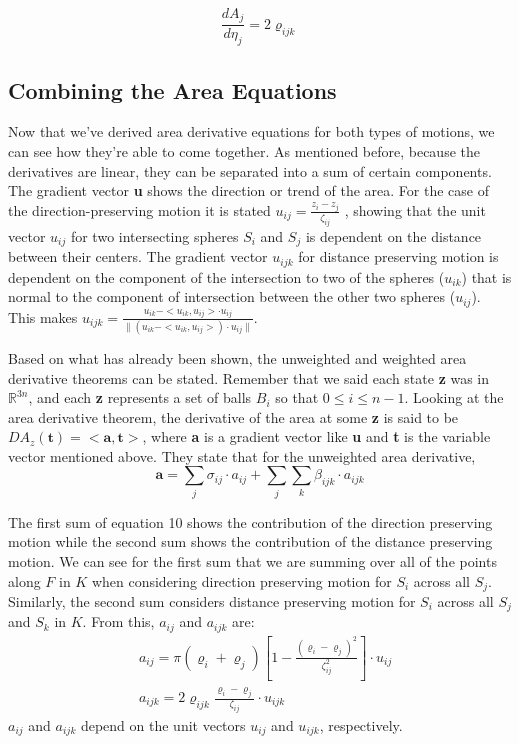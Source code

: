\documentclass{article}
\newcommand{\R}{\mathbb{R}}
\begin{document}
\begin{equation*}
\frac{dA_j}{d\eta_j }= 2\varrho_{ijk}
\end{equation*}

\subsection{Combining the Area Equations}
Now that we've derived area derivative equations for both types of motions, we can see how they’re able to come together. As mentioned before, because the derivatives are linear, they can be separated into a sum of certain components. The gradient vector \textbf{u} shows the direction or trend of the area. For the case of the direction-preserving motion it is stated $u_{ij} = \frac{z_i - z_j}{\zeta_{ij}}$ , showing that the unit vector $u_{ij}$ for two intersecting spheres $S_i$ and $S_j$ is dependent on the distance between their centers. The gradient vector $u_{ijk}$ for distance preserving motion is dependent on the component of the intersection to two of the spheres ($u_{ik}$) that is normal to the component of intersection between the other two spheres ($u_{ij}$). This makes $u_{ijk} = \frac{u_{ik} - <u_{ik},u_{ij}> \cdot u_{ij}}{\|(u_{ik} - <u_{ik},u_{ij}>) \cdot u_{ij}\|}$.

Based on what has already been shown, the unweighted and weighted area derivative theorems can be stated. Remember that we said each state \textbf{z} was in $\R^{3n}$, and each \textbf{z} represents a set of balls $B_i$ so that $0\leq i \leq n-1$. Looking at the area derivative theorem, the derivative of the area at some \textbf{z} is said to be $DA_z(\textbf{t}) = <\textbf{a},\textbf{t}>$, where \textbf{a} is a gradient vector like \textbf{u} and 	\textbf{t} is the variable vector mentioned above. They state that for the unweighted area derivative,
\begin{equation}
\textbf{a} = \sum_j \sigma_{ij}\cdot a_{ij}+ \sum_j \sum_k \beta_{ijk}\cdot a_{ijk}
\end{equation}

The first sum of equation 10 shows the contribution of the direction preserving motion while the second sum shows the contribution of the distance preserving motion. We can see for the first sum that we are summing over all of the points along $F$ in $K$ when considering direction preserving motion for $S_i$ across all $S_j$. Similarly, the second sum considers distance preserving motion for $S_i$ across all $S_j$ and $S_k$ in $K$. From this, $a_{ij}$ and $a_{ijk}$ are:
\begin{align*}
&a_{ij} = \pi(\varrho_i+\varrho_j)\left[1 - \frac{(\varrho_i - \varrho_j)^2}{\zeta_{ij}^2}\right]\cdot u_{ij}\\
&a_{ijk} = 2\varrho_{ijk}\frac{\varrho_i - \varrho_j}{\zeta_{ij}} \cdot u_{ijk}
\end{align*}
$a_{ij}$ and $a_{ijk}$ depend on the unit vectors $u_{ij}$ and $u_{ijk}$, respectively.
\end{document}
